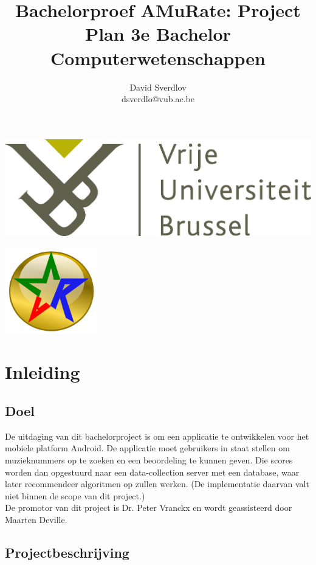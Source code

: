 \documentclass[11pt,a4paper]{article}
\author{David Sverdlov \\ dsverdlo@vub.ac.be}
\title{Bachelorproef AMuRate: Project Plan 3e Bachelor Computerwetenschappen}
\begin{document}
\begin{flushleft}
\noindent \includegraphics[width=0.6\linewidth]{Pictures/vub_logo.jpg} 
\end{flushleft}
{\let\newpage\relax\maketitle} %

\begin{center}
\includegraphics[width=4cm]{Pictures/amr_gold_thick.png} 
\end{center}



\newpage
\tableofcontents

\newpage
\section{Inleiding}
	\subsection{Doel}
De uitdaging van dit bachelorproject is om een applicatie te ontwikkelen voor het mobiele platform Android. De applicatie moet gebruikers in staat stellen om muzieknummers op te zoeken en een beoordeling te kunnen geven. Die scores worden dan opgestuurd naar een data-collection server met een database, waar later recommendeer algoritmen op zullen werken. (De implementatie daarvan valt niet binnen de scope van dit project.) \\
De promotor van dit project is Dr. Peter Vranckx en wordt geassisteerd door Maarten Deville.

	\subsection{Projectbeschrijving}
	
\end{document}
